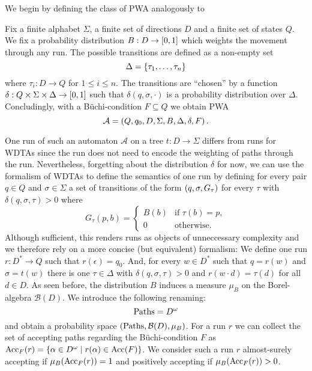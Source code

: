 We begin by defining the class of \ac{PWA} analogously to
\cite[Definition 4.1.1]{RandAutoInfTrees} 
\begin{definition}
  Fix a finite alphabet $\Sigma$, a finite set of directions $D$ and a finite
  set of states $Q$. We fix a probability distribution
  $B:D\rightarrow\left[0,1\right]$ which weights the movement through any run.
  The possible transitions are defined as a non-empty set
  \begin{equation*}
    \Delta = \left\{\tau_{1},\dots,\tau_{n}\right\}
  \end{equation*}
  where $\tau_{i}:D\rightarrow Q$ for $1\leq i\leq n$.
  The transitions are \enquote{chosen} by a function 
  $\delta:Q\times\Sigma\times\Delta\rightarrow\left[0,1\right]$ such that
  $\delta(q,\sigma,\cdot)$ is a probability distribution over $\Delta$.
  Concludingly, with a Büchi-condition $F\subseteq Q$ we obtain \ac{PWA}
  \begin{equation*}
    \mathcal{A} = \left(Q, q_{0}, D, \Sigma, B, \Delta, \delta, F\right).
  \end{equation*}
\end{definition}
One run of such an automaton $\mathcal{A}$ on a tree $t:D\rightarrow\Sigma$
differs from runs for \acp{WDTA} since the run does not need to encode the
weighting of paths through the run. Nevertheless, forgetting about the
distribution $\delta$ for now, we can use the formalism of \acp{WDTA} to define
the semantics of one run by defining for every pair $q\in Q$ and
$\sigma\in\Sigma$ a set of transitions of the form $\left(q,\sigma,G_{\tau}\right)$
for every $\tau$ with $\delta(q,\sigma,\tau)>0$ where
\begin{equation*}
  G_{\tau}(p,b) = \begin{cases}
    B(b)&\text{if }\tau(b) = p,\\
    0&\text{otherwise}.
  \end{cases}
\end{equation*}
Although sufficient, this renders runs as objects of unneccessary complexity
and we therefore rely on a more concise (but equivalent) formalism:
We define one run $r:D^{*}\rightarrow Q$ such that $r(\epsilon) = q_{0}$. And, 
for every $w\in D^{*}$ such that $q = r(w)$ and $\sigma = t(w)$ there is one
$\tau\in\Delta$ with $\delta(q,\sigma,\tau)>0$ and $r(w\cdot d)=\tau(d)$ 
for all $d\in D$. As seen before, the distribution $B$ induces a measure
$\mu_{B}$ on the Borel-algebra $\mathcal{B}(D)$. We introduce the following
renaming:
\begin{equation*}
  \operatorname{Paths} = D^{\omega}
\end{equation*}
and obtain a probability space $\left(\operatorname{Paths}, \mathcal{B}(D), \mu_{B}\right)$. For a
run $r$ we can collect the set of accepting paths regarding the Büchi-condition
$F$ as $\operatorname{Acc}_{F}(r) = \left\{\alpha\in D^{\omega}\mid r(\alpha)\in \operatorname{Acc}(F)\right\}$. We
consider such a run $r$ almost-surely accepting if $\mu_{B}(\operatorname{Acc}_{F}(r))=1$ and 
positively accepting if $\mu_{B}(\operatorname{Acc}_{F}(r))>0$.

